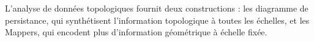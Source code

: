 




L'analyse de donn\'ees topologiques fournit deux constructions : les diagramme de persistance, qui synth\'etisent l'information topologique
\`a toutes les \'echelles, et les Mappers, qui encodent plus d'information g\'eom\'etrique \`a \'echelle fix\'ee.


